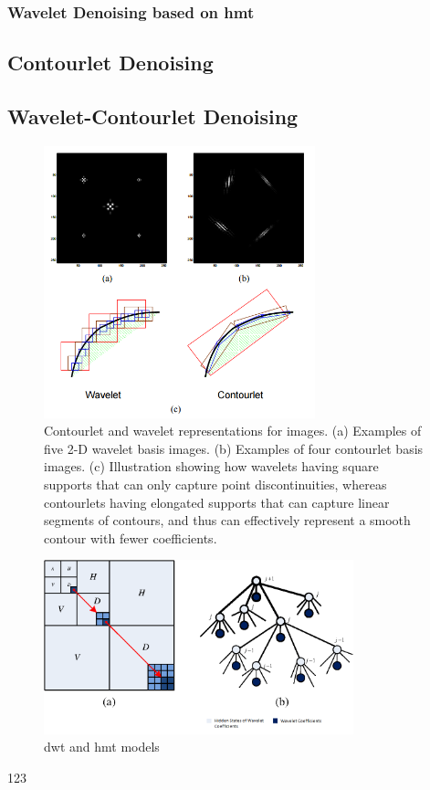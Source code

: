 \subsubsection*{Wavelet Denoising based on \glsdesc{hmt} }


\subsection{Contourlet Denoising}
\cite{po2003directional}

\subsection{Wavelet-Contourlet Denoising}

\begin{figure}[h]
	\centering
	\includegraphics[width=0.7\textwidth]{fig/wavelets_contourlet}
	\caption{Contourlet and wavelet representations for images. (a) Examples of
		five 2-D wavelet basis images. (b) Examples of four contourlet basis images.
		(c) Illustration showing how wavelets having square supports that can only
		capture point discontinuities, whereas contourlets having elongated supports
		that can capture linear segments of contours, and thus can effectively represent
		a smooth contour with fewer coefficients.
		}
	\label{fig:wavelets_contourlet}
\end{figure}


\begin{figure}[h]
	\centering
	\includegraphics[width=0.8\textwidth]{fig/wavelets_hmt}
	\caption{\glsdesc{dwt} and \glsdesc{hmt} models}
	\label{fig:wavelets_hmt}
\end{figure}


123